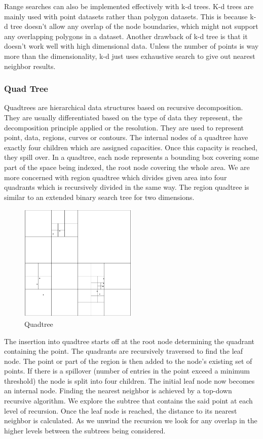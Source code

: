 \documentclass{sig-alternate-05-2015}
\begin{document}
Range searches can also be implemented effectively with k-d trees. K-d trees are mainly used with point datasets rather than polygon datasets. This is because k-d tree doesn’t allow any overlap of the node boundaries, which might not support any overlapping polygons in a dataset. Another drawback of k-d tree is that it doesn’t work well with high dimensional data. Unless the number of points is way more than the dimensionality, k-d just uses exhaustive search to give out nearest neighbor results. 


\subsubsection{Quad Tree}

Quadtrees are hierarchical data structures based on recursive decomposition. They are usually differentiated based on the type of data they represent, the decomposition principle applied or the resolution. They are used to represent point, data, regions, curves or contours. The internal nodes of a quadtree have exactly four children which are assigned capacities. Once this capacity is reached, they spill over. In a quadtree, each node represents a bounding box covering some part of the space being indexed, the root node covering the whole area. We are more concerned with region quadtree which divides given area into four quadrants which is recursively divided in the same way. The region quadtree is similar to an extended binary search tree for two dimensions.\cite{samet1984quadtree} 

\begin{figure}[h!]
\centering
\includegraphics[width=0.5\textwidth]{quadtree2.png}
\caption{Quadtree}
\end{figure}

The insertion into quadtree starts off at the root node determining the quadrant containing the point. The quadrants are recursively traversed to find the leaf node. The point or part of the region is then added to the node’s existing set of points. If there is a spillover (number of entries in the point exceed a minimum threshold) the node is split into four children. The initial leaf node now becomes an internal node. Finding the nearest neighbor is achieved by a top-down recursive algorithm. We explore the subtree that contains the said point at each level of recursion. Once the leaf node is reached, the distance to its nearest neighbor is calculated. As we unwind the recursion we look for any overlap in the higher levels between the subtrees being considered. 
\end{document}
